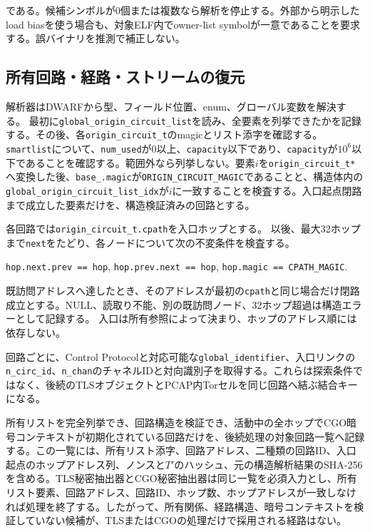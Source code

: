 \documentclass[10pt,a4paper]{ltjsarticle}
\newcommand{\code}[1]{\nolinkurl{#1}}
\begin{document}
である。候補シンボルが0個または複数なら解析を停止する。外部から明示したload biasを使う場合も、対象ELF内でowner-list symbolが一意であることを要求する。誤バイナリを推測で補正しない。

\subsection{所有回路・経路・ストリームの復元}

解析器はDWARFから型、フィールド位置、enum、グローバル変数を解決する。
最初に\code{global_origin_circuit_list}を読み、全要素を列挙できたかを記録する。その後、各\code{origin_circuit_t}のmagicとリスト添字を確認する。
\code{smartlist}について、\code{num_used}が0以上、\code{capacity}以下であり、\code{capacity}が$10^6$以下であることを確認する。範囲外なら列挙しない。要素$i$を\code{origin_circuit_t*}へ変換した後、\code{base_.magic}が\code{ORIGIN_CIRCUIT_MAGIC}であることと、構造体内の\code{global_origin_circuit_list_idx}が$i$に一致することを検査する。入口起点閉路まで成立した要素だけを、構造検証済みの回路とする。

各回路では\code{origin_circuit_t.cpath}を入口ホップとする。
以後、最大32ホップまで\code{next}をたどり、各ノードについて次の不変条件を検査する。

\begin{center}
\code{hop.next.prev == hop},\quad
\code{hop.prev.next == hop},\quad
\code{hop.magic == CPATH_MAGIC}.
\end{center}

既訪問アドレスへ達したとき、そのアドレスが最初の\code{cpath}と同じ場合だけ閉路成立とする。NULL、読取り不能、別の既訪問ノード、32ホップ超過は構造エラーとして記録する。
入口は所有参照によって決まり、ホップのアドレス順には依存しない。

回路ごとに、Control Protocolと対応可能な\code{global_identifier}、入口リンクの\code{n_circ_id}、\code{n_chan}のチャネルIDと対向識別子を取得する。これらは探索条件ではなく、後続のTLSオブジェクトとPCAP内Torセルを同じ回路へ結ぶ結合キーになる。

所有リストを完全列挙でき、回路構造を検証でき、活動中の全ホップでCGO暗号コンテキストが初期化されている回路だけを、後続処理の対象回路一覧へ記録する。この一覧には、所有リスト添字、回路アドレス、二種類の回路ID、入口起点のホップアドレス列、ノンスと$T'$のハッシュ、元の構造解析結果のSHA-256を含める。TLS秘密抽出器とCGO秘密抽出器は同じ一覧を必須入力とし、所有リスト要素、回路アドレス、回路ID、ホップ数、ホップアドレスが一致しなければ処理を終了する。したがって、所有関係、経路構造、暗号コンテキストを検証していない候補が、TLSまたはCGOの処理だけで採用される経路はない。
\end{document}
